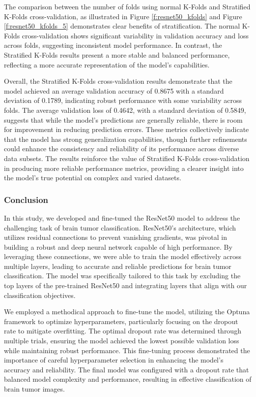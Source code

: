 The comparison between the number of folds using normal K-Folds and Stratified K-Folds cross-validation, as illustrated in Figure \ref{f:resnet50_kfolds} and Figure \ref{f:resnet50_kfolds_5} demonstrates clear benefits of stratification. The normal K-Folds cross-validation shows significant variability in validation accuracy and loss across folds, suggesting inconsistent model performance. In contrast, the Stratified K-Folds results present a more stable and balanced performance, reflecting a more accurate representation of the model's capabilities.

Overall, the Stratified K-Folds cross-validation results demonstrate that the model achieved an average validation accuracy of 0.8675 with a standard deviation of 0.1789, indicating robust performance with some variability across folds. The average validation loss of 0.4642, with a standard deviation of 0.5849, suggests that while the model's predictions are generally reliable, there is room for improvement in reducing prediction errors. These metrics collectively indicate that the model has strong generalization capabilities, though further refinements could enhance the consistency and reliability of its performance across diverse data subsets. The results reinforce the value of Stratified K-Folds cross-validation in producing more reliable performance metrics, providing a clearer insight into the model's true potential on complex and varied datasets.

\subsubsection{Conclusion}\label{s:conclusion}

In this study, we developed and fine-tuned the ResNet50 model to address the challenging task of brain tumor classification. ResNet50's architecture, which utilizes residual connections to prevent vanishing gradients, was pivotal in building a robust and deep neural network capable of high performance. By leveraging these connections, we were able to train the model effectively across multiple layers, leading to accurate and reliable predictions for brain tumor classification. The model was specifically tailored to this task by excluding the top layers of the pre-trained ResNet50 and integrating layers that align with our classification objectives.

We employed a methodical approach to fine-tune the model, utilizing the Optuna framework to optimize hyperparameters, particularly focusing on the dropout rate to mitigate overfitting. The optimal dropout rate was determined through multiple trials, ensuring the model achieved the lowest possible validation loss while maintaining robust performance. This fine-tuning process demonstrated the importance of careful hyperparameter selection in enhancing the model's accuracy and reliability. The final model was configured with a dropout rate that balanced model complexity and performance, resulting in effective classification of brain tumor images.

